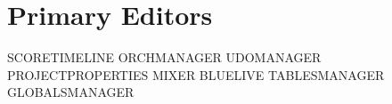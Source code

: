 \section{Primary Editors}\label{primaryEditors}

SCORETIMELINE ORCHMANAGER UDOMANAGER PROJECTPROPERTIES MIXER BLUELIVE
TABLESMANAGER GLOBALSMANAGER
